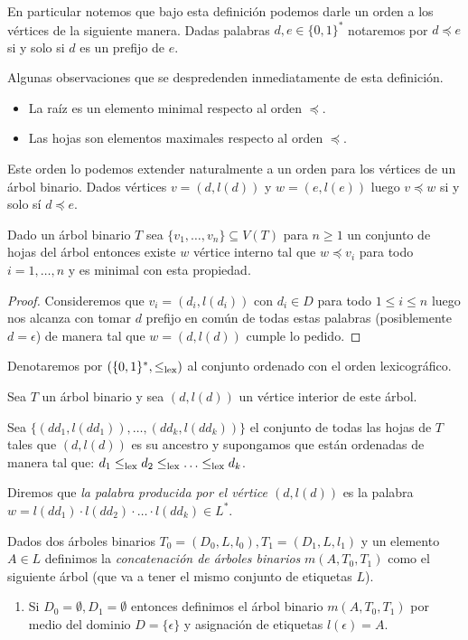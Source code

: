\documentclass[tesis.tex]{subfiles}
\begin{document}
\begin{leoenv}
En particular notemos que bajo esta definición podemos darle un orden a los vértices de la siguiente manera.
Dadas palabras $d,e \in \{0,1\}^{*}$ notaremos por $d \preceq e$ si y solo si $d$ es un prefijo de $e$.

Algunas observaciones que se despredenden inmediatamente de esta definición.
\begin{itemize}
	\item La raíz es un elemento minimal respecto al orden $\preceq$.
	\item Las hojas son elementos maximales respecto al orden $\preceq$.
\end{itemize}

Este orden lo podemos extender naturalmente a un orden para los vértices de un árbol binario. 
Dados vértices $v =(d,l(d))$ y $w = (e,l(e))$ luego $v \preceq w$ si y solo sí $d \preceq e$.

\begin{lema}\label{lema:arbol_binario_meet}
	Dado un árbol binario $T$ 
	sea $\{ v_{1}, \dots, v_{n} \} \subseteq V(T)$ para $n \ge 1$ un conjunto de hojas del árbol 
	entonces existe $w$ vértice interno tal que $w \preceq v_{i}$ para todo $i=1, \dots, n$ y es minimal con esta propiedad.
\end{lema}
\begin{proof}
	Consideremos que $v_{i} = (d_{i}, l(d_{i}))$ con $d_{i} \in D$ para todo $1 \le i \le n$ luego nos alcanza con tomar $d$ prefijo en común de todas estas palabras (posiblemente $d = \epsilon$) de manera tal que $w = (d,l(d))$ cumple lo pedido.

\end{proof}

Denotaremos por $(\{0,1 \}^{*}, \le_{\textrm{lex}})$ al conjunto ordenado con el orden lexicográfico.

\begin{deff}
	Sea $T$ un árbol binario y sea $(d,l(d))$ un vértice interior de este árbol.

	Sea $\{ (dd_{1},l(dd_{1})), \dots, (dd_{k},l(dd_{k})) \}$  el conjunto de todas las hojas de $T$ tales que $(d,l(d))$ es su ancestro y supongamos que están ordenadas de manera tal que: 
	$d_{1} \lexorder d_{2} \lexorder \dots \lexorder d_{k}$.

	Diremos que \emph{la palabra producida por el vértice $(d,l(d))$} es la palabra 
	$w = l(dd_{1}) \cdot l(dd_{2}) \cdot \dots \cdot l(dd_{k}) \in L^{*}$.
\end{deff}

\begin{deff}
	Dados dos árboles binarios $T_{0} = (D_{0}, L, l_{0}), T_{1} =(D_{1},L,l_{1})$ y un elemento $A \in L$ definimos la \emph{concatenación de árboles binarios} $m(A,T_{0},T_{1})$ como el siguiente árbol (que va a tener el mismo conjunto de etiquetas $L$).
	\begin{enumerate}
		\item Si $D_{0} = \emptyset, D_{1} = \emptyset$ entonces definimos el árbol binario $m(A,T_{0},T_{1})$ por medio del dominio 
		$D = \{ \epsilon \}$ y asignación de etiquetas $l(\epsilon) = A$.


\end{enumerate}
\end{deff}
\end{leoenv}
\end{document}
